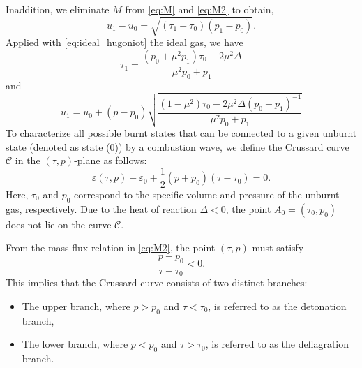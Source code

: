 Inaddition, we eliminate $M$ from \eqref{eq:M} and \eqref{eq:M2} to obtain,
\begin{equation}
u_1 - u_0 = \sqrt{(\tau_1 - \tau_0)(p_1 - p_0)}.
\label{eq:u10}
\end{equation}
Applied with \eqref{eq:ideal_hugoniot} the ideal gas, we have
\begin{equation}
\tau_1 = \frac{(p_0+\mu^2p_1)\tau_0-2\mu^2 \Delta}{\mu^2p_0+p_1}
\end{equation}
and
\begin{equation}
\label{eq:CombustionU}
u_1 = u_0 + (p-p_0)\sqrt{\frac{(1-\mu^2)\tau_0-2\mu^2 \Delta (p_0-p_1)^{-1}}{\mu^2p_0+p_1}}
\end{equation} 
To characterize all possible burnt states that can be connected to a given unburnt state (denoted as state (0)) by a combustion wave, we define the Crussard curve $\mathcal{C}$ in the $(\tau, p)$-plane as follows:
\begin{equation}
 \varepsilon(\tau, p) - \varepsilon_0 + \frac{1}{2}(p + p_0)(\tau - \tau_0) = 0.
\end{equation}
Here, $\tau_0$ and $p_0$ correspond to the specific volume and pressure of the unburnt gas, respectively. 
Due to the heat of reaction $\Delta<0$, the point $A_0=(\tau_0,p_0)$ does not lie on the curve $\mathcal{C}$.

From the mass flux relation in \eqref{eq:M2}, the point $(\tau,p)$ must satisfy
\begin{equation}
\frac{p-p_0}{\tau-\tau_0} < 0.
\end{equation}
This implies that the Crussard curve consists of two distinct branches:
\begin{itemize}
  \item The upper branch, where $p>p_0$ and $\tau<\tau_0$, is referred to as the detonation branch,
  \item The lower branch, where $p<p_0$ and $\tau>\tau_0$, is referred to as the deflagration branch.
\end{itemize}

